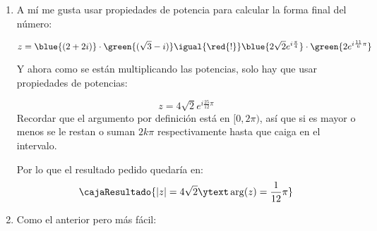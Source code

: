 \begin{enumerate}[label=\roman*)]
  \item A mí me gusta usar propiedades de potencia para calcular la forma final del número:

        \begin{minipage}{0.2\textwidth}
        \end{minipage}
        \begin{minipage}{0.7\textwidth}
          $$
            z = \blue{(2+2i)} \cdot \green{(\sqrt{3} - i)}
            \igual{\red{!}}
            \blue{2\sqrt{2}e^{i \frac{\pi}{4}}} \cdot \green{2 e^{i\frac{11}{6}\pi}}
          $$
        \end{minipage}

        Y ahora como se están multiplicando las potencias, solo hay que usar propiedades de potencias:

        $$
          z = 4\sqrt{2} e^{i\frac{25}{12}\pi}
        $$
        Recordar que el argumento por definición está en $[0, 2\pi)$, así que si es mayor o menos se le restan o suman $2k\pi$ respectivamente hasta que
        caiga en el intervalo.

        Por lo que el resultado pedido quedaría en:
        $$
          \cajaResultado{
            |z| = 4\sqrt{2}
            \ytext
            \arg(z) = \frac{1}{12} \pi
          }
        $$

  \item Como el anterior pero más fácil:


\end{enumerate}
